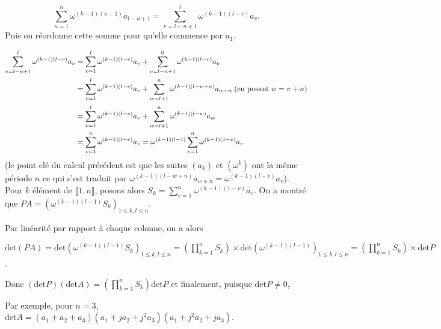 {{$$\sum_{u=1}^{n}\omega^{(k-1)(u-1)}a_{l-u+1}=\sum_{v=l-n+1}^{l}\omega^{(k-1)(l-v)}a_v.$$
Puis on réordonne cette somme pour qu'elle commence par $a_1$.

\begin{align*}\ensuremath
\sum_{v=l-n+1}^{l}\omega^{(k-1)(l-v)}a_v&=\sum_{v=1}^{l}\omega^{(k-1)(l-v)}a_v
+\sum_{v=l-n+1}^{0}\omega^{(k-1)(l-v)}a_v\\
 &=\sum_{v=1}^{l}\omega^{(k-1)(l-v)}a_v+\sum_{w=l+1}^{n}\omega^{(k-1)(l-w+n)}a_{w+n}\;(\mbox{en posant}\;w=v+n)\\
 &=\sum_{v=1}^{l}\omega^{(k-1)(l-v)}a_v+\sum_{w=l+1}^{n}\omega^{(k-1)(l-w)}a_{w}\\
 &=\sum_{v=1}^{n}\omega^{(k-1)(l-v)}a_v=\omega^{(k-1)(l-1)}\sum_{v=1}^{n}\omega^{(k-1)(1-v)}a_v
\end{align*}
(le point clé du calcul précédent est que les suites $(a_k)$ et $(\omega^k)$ ont la même période $n$ ce qui s'est traduit par
$\omega^{(k-1)(l-w+n)}a_{w+n}=\omega^{(k-1)(l-v)}a_v$).
Pour $k$ élément de $\llbracket1,n\rrbracket$, posons alors $S_k=\sum_{v=1}^{n}\omega^{(k-1)(1-v)}a_v$. On a montré que $PA=(\omega^{(k-1)(l-1)}S_k)_{1\leq k,l\leq n}$.

Par linéarité par rapport à chaque colonne, on a alors

\begin{center}
$\mbox{det}(PA)=\mbox{det}(\omega^{(k-1)(l-1)}S_k)_{1\leq k,l\leq n}=\left(\prod_{k=1}^{n}S_k\right)\times\mbox{det}(\omega^{(k-1)(l-1)})_{1\leq k,l\leq n}=\left(\prod_{k=1}^{n}S_k\right)\times\mbox{det}P$.
\end{center}
Donc $(\mbox{det}P)(\mbox{det}A)=\left(\prod_{k=1}^{n}S_k\right)\mbox{det}P$ et finalement, puisque $\mbox{det}P\neq0$,

\begin{center}
\end{center}
Par exemple, pour $n=3$, $\mbox{det}A=(a_1+a_2+a_3)(a_1+ja_2+j^2a_3)(a_1+j^2a_2+ja_3)$.
}
}
